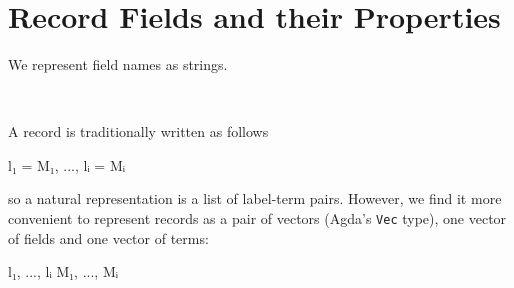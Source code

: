 \begin{fence}
\begin{code}
\AgdaSpace{}%
\AgdaOperator{\AgdaInductiveConstructor{\AgdaUnderscore{}\#\AgdaUnderscore{}}}\<%
\\
\>[0]\AgdaSpace{}%
\AgdaSpace{}%
\<%
\\
\>[0]\AgdaSpace{}%
\AgdaSpace{}%
\<%
\\
%
\\[\AgdaEmptyExtraSkip]%
\>[0]\AgdaSpace{}%
\AgdaSpace{}%
\AgdaOperator{\AgdaFunction{\AgdaUnderscore{}[\AgdaUnderscore{}]}}\<%
\\
\>[0]\AgdaSpace{}%
\AgdaSpace{}%
\<%
\end{code}
\end{fence}

\hypertarget{record-fields-and-their-properties}{%
\section{Record Fields and their
Properties}\label{record-fields-and-their-properties}}

We represent field names as strings.

\begin{fence}
\begin{code}%
\>[0]\AgdaSpace{}%
\AgdaSymbol{:}\AgdaSpace{}%
\<%
\\
\>[0]\AgdaSpace{}%
\AgdaSymbol{=}\AgdaSpace{}%
\<%
\end{code}
\end{fence}

A record is traditionally written as follows

\begin{myDisplay}
{ l₁ = M₁, ..., lᵢ = Mᵢ }
\end{myDisplay}

so a natural representation is a list of label-term pairs. However, we
find it more convenient to represent records as a pair of vectors
(Agda's \texttt{Vec} type), one vector of fields and one vector of
terms:

\begin{myDisplay}
l₁, ..., lᵢ
M₁, ..., Mᵢ
\end{myDisplay}

